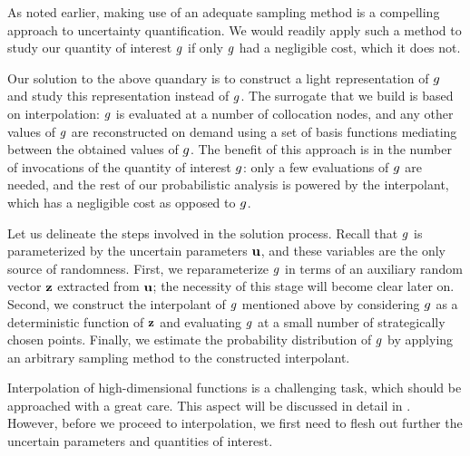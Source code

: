 As noted earlier, making use of an adequate sampling method is a compelling
approach to uncertainty quantification. We would readily apply such a method to
study our quantity of interest $g$ if only $g$ had a negligible cost, which it
does not.

Our solution to the above quandary is to construct a light representation of
$g$ and study this representation instead of $g$. The surrogate that we build
is based on interpolation: $g$ is evaluated at a number of collocation nodes,
and any other values of $g$ are reconstructed on demand using a set of basis
functions mediating between the obtained values of $g$. The benefit of this
approach is in the number of invocations of the quantity of interest $g$: only
a few evaluations of $g$ are needed, and the rest of our probabilistic analysis
is powered by the interpolant, which has a negligible cost as opposed to $g$.

Let us delineate the steps involved in the solution process. Recall that $g$ is
parameterized by the uncertain parameters $\mathbf{u}$, and these variables are the
only source of randomness. First, we reparameterize $g$ in terms of an
auxiliary random vector $\mathbf{z}$ extracted from $\mathbf{u}$; the necessity of this stage
will become clear later on. Second, we construct the interpolant of $g$
mentioned above by considering $g$ as a deterministic function of $\mathbf{z}$ and
evaluating $g$ at a small number of strategically chosen points. Finally, we
estimate the probability distribution of $g$ by applying an arbitrary sampling
method to the constructed interpolant.

Interpolation of high-dimensional functions is a challenging task, which should
be approached with a great care. This aspect will be discussed in detail in
. However, before we proceed to interpolation, we first need
to flesh out further the uncertain parameters and quantities of interest.
